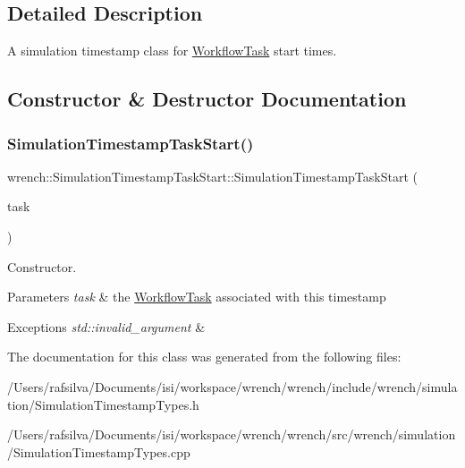 \subsection{Detailed Description}
A simulation timestamp class for \hyperlink{classwrench_1_1_workflow_task}{Workflow\+Task} start times. 

\subsection{Constructor \& Destructor Documentation}
\mbox{\label{classwrench_1_1_simulation_timestamp_task_start_a70b133f9ae730b04250a55b8e2c9b036}} 
\subsubsection{\texorpdfstring{Simulation\+Timestamp\+Task\+Start()}{SimulationTimestampTaskStart()}}
{\footnotesize\ttfamily wrench\+::\+Simulation\+Timestamp\+Task\+Start\+::\+Simulation\+Timestamp\+Task\+Start (\begin{DoxyParamCaption}\item[{\hyperlink{classwrench_1_1_workflow_task}{Workflow\+Task} $\ast$}]{task }\end{DoxyParamCaption})}



Constructor. 


\begin{DoxyParams}{Parameters}
{\em task} & the \hyperlink{classwrench_1_1_workflow_task}{Workflow\+Task} associated with this timestamp \\
\hline
\end{DoxyParams}

\begin{DoxyExceptions}{Exceptions}
{\em std\+::invalid\+\_\+argument} & \\
\hline
\end{DoxyExceptions}


The documentation for this class was generated from the following files\+:\begin{DoxyCompactItemize}
\item 
/\+Users/rafsilva/\+Documents/isi/workspace/wrench/wrench/include/wrench/simulation/Simulation\+Timestamp\+Types.\+h\item 
/\+Users/rafsilva/\+Documents/isi/workspace/wrench/wrench/src/wrench/simulation/Simulation\+Timestamp\+Types.\+cpp\end{DoxyCompactItemize}
